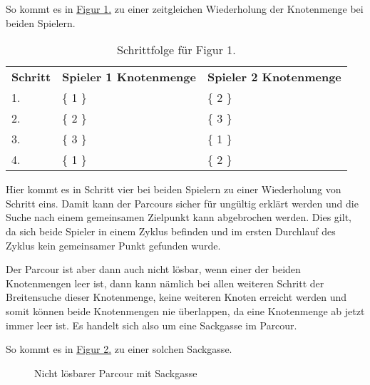 \documentclass[a4paper,10pt,ngerman]{scrartcl}
\begin{document}
    So kommt es in \hyperref[fig:Figure1]{Figur 1.} zu einer zeitgleichen Wiederholung der Knotenmenge bei beiden Spielern.

    \begin{table}
        \centering
        \begin{tabular}{lll}
            \textbf{Schritt} & \textbf{Spieler 1 Knotenmenge} & \textbf{Spieler 2 Knotenmenge} \\
            1.               & \{ 1 \}                        & \{ 2 \}                        \\
            2.               & \{ 2 \}                        & \{ 3 \}                        \\
            3.               & \{ 3 \}                        & \{ 1 \}                        \\
            4.               & \{ 1 \}                        & \{ 2 \}                        \\
        \end{tabular}
        \caption{Schrittfolge für Figur 1.}
        \label{tab:Table1}
    \end{table}

    Hier kommt es in Schritt vier bei beiden Spielern zu einer Wiederholung von Schritt eins.
    Damit kann der Parcours sicher für ungültig erklärt werden
    und die Suche nach einem gemeinsamen Zielpunkt kann abgebrochen werden.
    Dies gilt, da sich beide Spieler in einem Zyklus befinden
    und im ersten Durchlauf des Zyklus kein gemeinsamer Punkt gefunden wurde.

    Der Parcour ist aber dann auch nicht lösbar, wenn einer der beiden Knotenmengen leer ist,
    dann kann nämlich bei allen weiteren Schritt der Breitensuche dieser Knotenmenge,
    keine weiteren Knoten erreicht werden und somit können beide Knotenmengen nie überlappen,
    da eine Knotenmenge ab jetzt immer leer ist.
    Es handelt sich also um eine Sackgasse im Parcour.

    So kommt es in \hyperref[fig:Figure2]{Figur 2.} zu einer solchen Sackgasse.

    \begin{figure}[htb]
        \centering
        \NameOfAdigraph{}
        \caption{Nicht lösbarer Parcour mit Sackgasse}
        \label{fig:Figure2}
    \end{figure}
\end{document}
